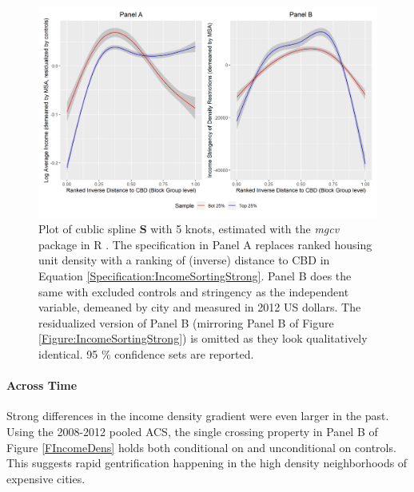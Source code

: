 \documentclass[]{article}
\begin{document}
	
	\begin{figure}[!ht]
		\begin{center}
			\includegraphics[width=\textwidth]{CBD_combined.png}
			\caption{Plot of cublic spline $\mathbf{S}$ with 5 knots, estimated with the \textit{mgcv} package in R \citep{gampackage}. The specification in Panel A replaces ranked housing unit density with a ranking of (inverse) distance to CBD in Equation \eqref{Specification:IncomeSortingStrong}. Panel B does the same with excluded controls and stringency as the independent variable, demeaned by city and measured in 2012 US dollars. The residualized version of Panel B (mirroring Panel B of Figure \ref{Figure:IncomeSortingStrong}) is omitted as they look qualitatively identical. 95 \% confidence sets are reported.  }\label{Figure:CBD} 
		\end{center}
	\end{figure}
	
	\paragraph*{Across Time}  Strong differences in the income density gradient were even larger in the past. Using the 2008-2012 pooled ACS, the single crossing property in Panel B of Figure \ref{FIncomeDens} holds both conditional on and unconditional on controls. This suggests rapid gentrification happening in the high density neighborhoods of expensive cities. 
		
\end{document}
